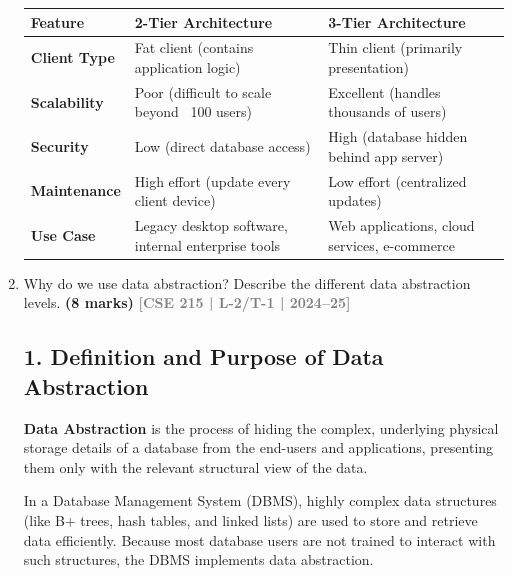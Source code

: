 \documentclass[12pt,a3paper]{article}
\newcommand{\yr}[1]{\hfill\textcolor{gray}{\small\textbf{[#1]}}}
\newcommand{\mk}[1]{\textcolor{orange!70!black}{\small\textbf{(#1 marks)}}}
\begin{document}
\begin{enumerate}
\begin{tcolorbox}[enhanced,breakable,ansbox,colback=cA!4,colframe=cA,boxrule=0.8pt,arc=5pt,title={\textbf{Answer}},fonttitle=\bfseries\color{white},colbacktitle=cA]
\begin{center}
\renewcommand{\arraystretch}{1.4}
\begin{tabular}{@{} l l l @{}}
\toprule
\textbf{Feature} & \textbf{2-Tier Architecture} & \textbf{3-Tier Architecture} \\
\midrule
\textbf{Client Type} & Fat client (contains application logic) & Thin client (primarily presentation) \\
\textbf{Scalability} & Poor (difficult to scale beyond ~100 users) & Excellent (handles thousands of users) \\
\textbf{Security} & Low (direct database access) & High (database hidden behind app server) \\
\textbf{Maintenance} & High effort (update every client device) & Low effort (centralized updates) \\
\textbf{Use Case} & Legacy desktop software, internal enterprise tools & Web applications, cloud services, e-commerce \\
\bottomrule
\end{tabular}
\end{center}

\end{tcolorbox}

\item Why do we use data abstraction? Describe the different data abstraction levels.
\mk{8} \yr{CSE 215 | L-2/T-1 | 2024--25}

\begin{tcolorbox}[enhanced,breakable,ansbox,colback=cA!4,colframe=cA,boxrule=0.8pt,arc=5pt,title={\textbf{Answer}},fonttitle=\bfseries\color{white},colbacktitle=cA]

\subsection*{1. Definition and Purpose of Data Abstraction}

\textbf{Data Abstraction} is the process of hiding the complex, underlying physical storage details of a database from the end-users and applications, presenting them only with the relevant structural view of the data. 

In a Database Management System (DBMS), highly complex data structures (like B+ trees, hash tables, and linked lists) are used to store and retrieve data efficiently. Because most database users are not trained to interact with such structures, the DBMS implements data abstraction.


\end{tcolorbox}
\end{enumerate}
\end{document}
